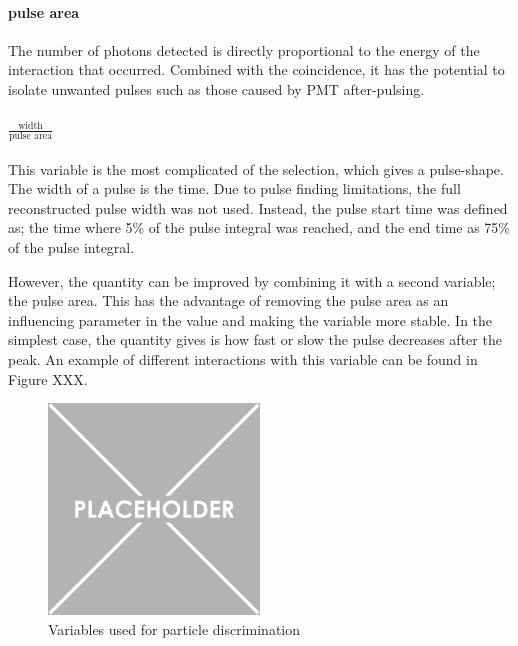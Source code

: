\paragraph{pulse area}
The number of photons detected is directly proportional to the energy of the interaction that occurred.
Combined with the coincidence, it has the potential to isolate unwanted pulses such as those caused by PMT after-pulsing.


\paragraph{$\frac{\text{width}}{\text{pulse area}}$}
This variable is the most complicated of the selection, which gives a pulse-shape.
The width of a pulse is the time.
Due to pulse finding limitations, the full reconstructed pulse width was not used.
Instead, the pulse start time was defined as; the time where 5\% of the pulse integral was reached, and the end time as 75\% of the pulse integral.

However, the quantity can be improved by combining it with a second variable; the pulse area.
This has the advantage of removing the pulse area as an influencing parameter in the value and making the variable more stable.
In the simplest case, the quantity gives is how fast or slow the pulse decreases after the peak.
An example of different interactions with this variable can be found in Figure XXX.

\begin{figure}[!htbp]
    \centering
    \includegraphics[width=0.5\textwidth]{Figures/Placeholder.png}
    \caption{Variables used for particle discrimination}
    \label{fig:discrimination_variables}
\end{figure}



